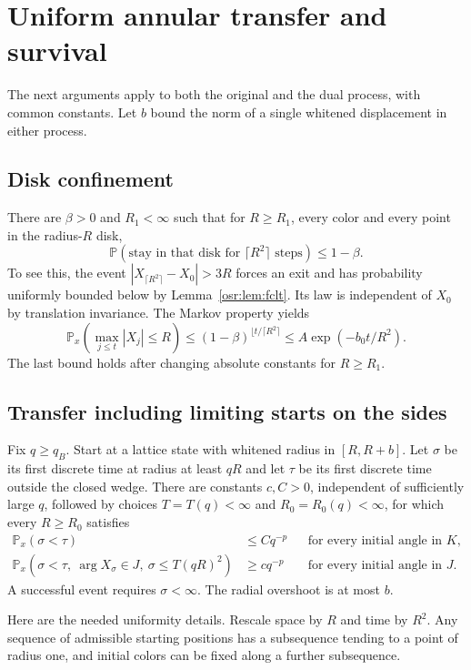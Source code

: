 \documentclass[11pt,letterpaper]{article}
\newcommand{\Prob}{\mathbb P}\newcommand{\E}{\mathbb E}
\numberwithin{equation}{section}
\begin{document}
\section{Uniform annular transfer and survival}\label{osr:sec:annuli}
The next arguments apply to both the original and the dual process, with common constants. Let $b$ bound the norm of a single whitened displacement in either process.

\subsection{Disk confinement}
There are $\beta>0$ and $R_1<\infty$ such that for $R\ge R_1$, every color and every point in the radius-$R$ disk,
\[
 \Prob(\text{stay in that disk for }\lceil R^2\rceil\text{ steps})\le1-\beta.
\]
To see this, the event $|X_{\lceil R^2\rceil}-X_0|>3R$ forces an exit and has probability uniformly bounded below by Lemma~\ref{osr:lem:fclt}. Its law is independent of $X_0$ by translation invariance. The Markov property yields
\begin{equation}\label{osr:eq:disktail}
 \Prob_x\left(\max_{j\le t}|X_j|\le R\right)
 \le(1-\beta)^{\lfloor t/\lceil R^2\rceil}
 \le A\exp(-b_0t/R^2).
\end{equation}
The last bound holds after changing absolute constants for $R\ge R_1$.

\subsection{Transfer including limiting starts on the sides}
Fix $q\ge q_B$. Start at a lattice state with whitened radius in $[R,R+b]$. Let $\sigma$ be its first discrete time at radius at least $qR$ and let $\tau$ be its first discrete time outside the closed wedge. There are constants $c,C>0$, independent of sufficiently large $q$, followed by choices $T=T(q)<\infty$ and $R_0=R_0(q)<\infty$, for which every $R\ge R_0$ satisfies
\begin{align}
 \Prob_x(\sigma<\tau)&\le Cq^{-p}
 &&\text{for every initial angle in }K,\label{osr:eq:annupper}\\
 \Prob_x(\sigma<\tau,\ \arg X_\sigma\in J,\
                \sigma\le T(qR)^2)&\ge cq^{-p}
 &&\text{for every initial angle in }J.\label{osr:eq:annlower}
\end{align}
A successful event requires $\sigma<\infty$. The radial overshoot is at most $b$.

Here are the needed uniformity details. Rescale space by $R$ and time by $R^2$. Any sequence of admissible starting positions has a subsequence tending to a point of radius one, and initial colors can be fixed along a further subsequence.
\end{document}
